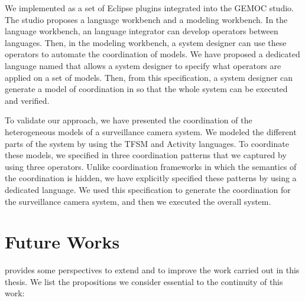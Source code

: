 We implemented \bcool as a set of Eclipse plugins integrated into the GEMOC studio. The studio proposes a language workbench and a modeling workbench. In the language workbench, an language integrator can develop operators between languages. Then, in the modeling workbench, a system designer can use these operators to automate the coordination of models. We have proposed a dedicated language named \bflow that allows a system designer to specify what operators are applied on a set of models. Then, from this specification, a system designer can generate a model of coordination in \ccsl so that the whole system can be executed and verified.  
	
To validate our approach, we have presented the coordination of the heterogeneous models of a surveillance camera system. We modeled the different parts of the system by using the TFSM and Activity languages. To coordinate these models, we specified in \bcool three coordination patterns that we captured by using three operators. Unlike coordination frameworks in which the semantics of the coordination is hidden, we have explicitly specified these patterns by using a dedicated language. We used this specification to generate the coordination for the surveillance camera system, and then we executed the overall system.

	  
\section{Future Works}
\bcool provides some perspectives to extend and to improve the work carried out in this thesis. We list the propositions we consider essential to the continuity of this work:

